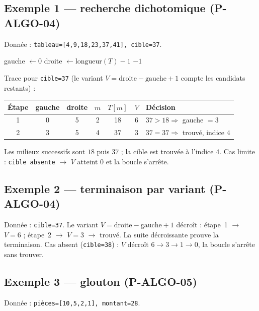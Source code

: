 \documentclass[a4paper,11pt]{article}
\begin{document}
\subsection*{Exemple 1 — recherche dichotomique (P-ALGO-04)}
Donnée : \texttt{tableau=[4,9,18,23,37,41], cible=37}.

\begin{algorithm}[H]
\SetAlgoLined
\DontPrintSemicolon
{}
gauche $\leftarrow 0$\;
droite $\leftarrow \text{longueur}(T) - 1$\;
\Return $-1$\;
\caption{Recherche dichotomique dans un tableau trié}
\end{algorithm}

\medskip
Trace pour \texttt{cible=37} (le variant $V = \text{droite} - \text{gauche} + 1$ compte les candidats restants) :

\begin{center}
\begin{tabular}{ccccccl}
\toprule
Étape & gauche & droite & $m$ & $T[m]$ & $V$ & Décision \\
\midrule
1 & 0 & 5 & 2 & 18 & 6 & $37 > 18 \Rightarrow$ gauche $= 3$ \\
2 & 3 & 5 & 4 & 37 & 3 & $37 = 37 \Rightarrow$ trouvé, indice $4$ \\
\bottomrule
\end{tabular}
\end{center}

Les milieux successifs sont $18$ puis $37$ ; la cible est trouvée à l'indice $4$. Cas limite : \texttt{cible absente} $\rightarrow$ $V$ atteint $0$ et la boucle s'arrête.

\subsection*{Exemple 2 — terminaison par variant (P-ALGO-04)}
Donnée : \texttt{cible=37}. Le variant $V = \text{droite} - \text{gauche} + 1$ décroît : étape~1 $\rightarrow$ $V=6$ ; étape~2 $\rightarrow$ $V=3$ $\rightarrow$ trouvé. La suite décroissante prouve la terminaison. Cas absent (\texttt{cible=38}) : $V$ décroît $6 \rightarrow 3 \rightarrow 1 \rightarrow 0$, la boucle s'arrête sans trouver.

\subsection*{Exemple 3 — glouton (P-ALGO-05)}
Donnée : \texttt{pièces=[10,5,2,1], montant=28}.
\end{document}
